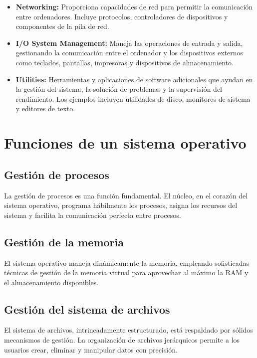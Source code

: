 \documentclass[a4paper]{article} %
\begin{document}
\begin{itemize}
    \item\textbf{Networking:} Proporciona capacidades de red para permitir la comunicación entre ordenadores. Incluye protocolos, controladores de dispositivos y componentes de la pila de red.
    \item\textbf{I/O System Management:} Maneja las operaciones de entrada y salida, gestionando la comunicación entre el ordenador y los dispositivos externos como teclados, pantallas, impresoras y dispositivos de almacenamiento.
    \item\textbf{Utilities:} Herramientas y aplicaciones de software adicionales que ayudan en la gestión del sistema, la solución de problemas y la supervisión del rendimiento. Los ejemplos incluyen utilidades de disco, monitores de sistema y editores de texto.
\end{itemize}

\newpage

\section{Funciones de un sistema operativo}

\subsection{Gestión de procesos}

La gestión de procesos es una función fundamental. El núcleo, en el corazón del sistema operativo, programa hábilmente los procesos, asigna los recursos del sistema y facilita la comunicación perfecta entre procesos. 

\subsection{Gestión de la memoria}

El sistema operativo maneja dinámicamente la memoria, empleando sofisticadas técnicas de gestión de la memoria virtual para aprovechar al máximo la RAM y el almacenamiento disponibles.

\subsection{Gestión del sistema de archivos}

El sistema de archivos, intrincadamente estructurado, está respaldado por sólidos mecanismos de gestión. La organización de archivos jerárquicos permite a los usuarios crear, eliminar y manipular datos con precisión.
\end{document}

